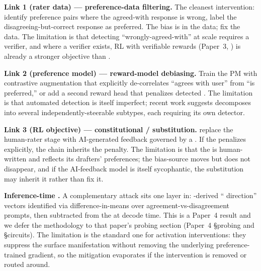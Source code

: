 \textbf{Link 1 (rater data) --- preference-data filtering.} The
cleanest intervention: identify preference pairs where the
agreed-with response is wrong, label the disagreeing-but-correct
response as preferred. The bias is in the data; fix the data. The
limitation is that detecting ``wrongly-agreed-with'' at scale
requires a verifier, and where a verifier exists, RL with
verifiable rewards (Paper~3, ) is already a stronger objective
than .

\textbf{Link 2 (preference model) --- reward-model debiasing.}
Train the PM with contrastive augmentation that explicitly
de-correlates ``agrees with user'' from ``is preferred,'' or add a
second reward head that penalizes detected . The
limitation is that automated  detection is itself
imperfect; recent work  suggests  decomposes into
several independently-steerable subtypes, each requiring its own
detector.

\textbf{Link 3 (RL objective) --- constitutional / 
substitution.} \citet{bai2022-cai} replace the human-rater stage
with AI-generated feedback governed by a . If the
 penalizes  explicitly, the chain inherits the
penalty. The limitation is that the  is human-written
and reflects its drafters' preferences; the bias-source moves but
does not disappear, and if the AI-feedback model is itself
sycophantic, the substitution may inherit it rather than fix it.

\textbf{Inference-time .} A complementary attack
sits one layer in: -derived `` direction'' vectors
identified via difference-in-means over agreement-vs-disagreement
prompts, then subtracted from the  at decode time.
This is a Paper~4 result and we defer the methodology to that
paper's probing section (Paper~4 \S probing and \S circuits). The
limitation is the standard one for activation interventions: they
suppress the surface manifestation without removing the underlying
preference-trained gradient, so the mitigation evaporates if the
intervention is removed or routed around.

